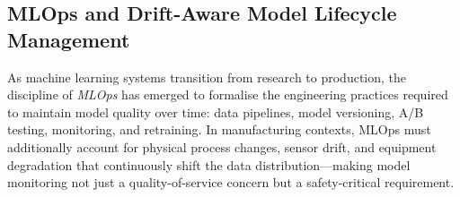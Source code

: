 

\subsection{MLOps and Drift-Aware Model Lifecycle Management}
\label{subsec:mlops}

As machine learning systems transition from research to
production, the discipline of \emph{MLOps} has emerged to
formalise the engineering practices required to maintain model
quality over time: data pipelines, model versioning, A/B testing,
monitoring, and retraining.
In manufacturing contexts, MLOps must additionally account for
physical process changes, sensor drift, and equipment degradation
that continuously shift the data distribution—making model
monitoring not just a quality-of-service concern but a
safety-critical requirement.

